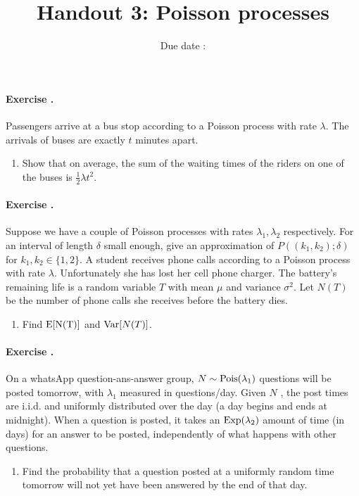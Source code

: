 \documentclass[12pt,a4paper]{article}
\title{ \bfseries \Huge {Handout 3: Poisson processes }}
\date{Due date : }
\newcounter{num}  %
\begin{document}
	\maketitle
	\paragraph{Exercise \thenum.}
	Passengers arrive at a bus stop according to a Poisson process with rate $\lambda$. The arrivals of buses are exactly $t$ minutes apart. 
	\begin{enumerate}
		\item 
	Show that on average, the sum of the waiting times of the riders on one of the buses is $\frac 1 2 \lambda t^2$.
	\end{enumerate}
	
	
	\paragraph{Exercise \thenum.}
	Suppose we have a couple of Poisson processes with rates $\lambda_1, \lambda_2$ respectively. 
	For an interval of length $ \delta$ small enough, give an approximation of $P((k_1,k_2);\delta)$ for $k_1,k_2\in\{1,2\}$.
	A student receives phone calls according to a Poisson process with rate $ \lambda$. 
	Unfortunately she has lost her cell phone charger. 
	The battery's remaining life is a random variable $T$ with mean $\mu$ and variance $\sigma^2$. Let $N(T)$ be the number of phone calls she receives before the battery dies.
	\begin{enumerate}
		\item Find $\rm E[N(T)]$ and ${\rm Var}[N(T)]$.
	\end{enumerate}
	
	\paragraph{Exercise \thenum.}
On a whatsApp question-ans-answer group, $N \sim {\rm Pois}(\lambda_1)$ questions will be posted tomorrow, with $\lambda_1$ measured in questions/day. Given $N$ , the post times are i.i.d. and
uniformly distributed over the day (a day begins and ends at midnight). 
When a question is posted, it takes an ${\rm Exp}(\lambda_2)$ amount of time (in days) for an answer to be posted,
independently of what happens with other questions.
\begin{enumerate}
	\item Find the probability that a question posted at a uniformly random time tomorrow will not yet have been answered by the end of that day.
\end{enumerate}
	
\end{document}
